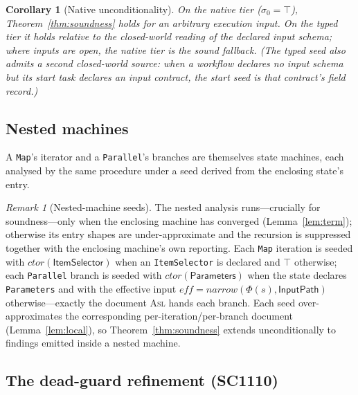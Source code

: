 \documentclass[11pt]{article}
\newcommand{\code}[1]{\textsf{\small #1}}
\newcommand{\asl}{\textsc{Asl}}
\newcommand{\narrow}{\mathit{narrow}}
\newcommand{\eff}{\mathit{eff}}
\theoremstyle{plain}
\newtheorem{corollary}{Corollary}
\theoremstyle{definition}
\theoremstyle{remark}
\newtheorem{remark}{Remark}
\begin{document}
\begin{corollary}[Native unconditionality]
On the native tier ($\sigma_0=\top$), Theorem~\ref{thm:soundness} holds for an arbitrary
execution input. On the typed tier it holds relative to the closed-world reading of the
declared input schema; where inputs are open, the native tier is the sound fallback. (The typed
seed also admits a second closed-world source: when a workflow declares no input schema but its
start task declares an input contract, the start seed is that contract's field record.)
\end{corollary}

\subsection{Nested machines}
\label{sec:tr:nested}

A \texttt{Map}'s iterator and a \texttt{Parallel}'s branches are themselves state machines, each
analysed by the same procedure under a seed derived from the enclosing state's entry.

\begin{remark}[Nested-machine seeds]\label{rmk:nested}
The nested analysis runs---crucially for soundness---only when the enclosing machine has
converged (Lemma~\ref{lem:term}); otherwise its entry shapes are under-approximate and the
recursion is suppressed together with the enclosing machine's own reporting. Each \texttt{Map}
iteration is seeded with $\mathit{ctor}(\textsf{ItemSelector})$ when an \texttt{ItemSelector} is
declared and $\top$ otherwise; each \texttt{Parallel} branch is seeded with
$\mathit{ctor}(\textsf{Parameters})$ when the state declares \texttt{Parameters} and with the
effective input $\eff=\narrow(\Phi(s),\textsf{InputPath})$ otherwise---exactly the document
\asl{} hands each branch. Each seed over-approximates the corresponding per-iteration/per-branch
document (Lemma~\ref{lem:local}), so Theorem~\ref{thm:soundness} extends unconditionally to
findings emitted inside a nested machine.
\end{remark}

\subsection{The dead-guard refinement (\code{SC1110})}
\label{sec:tr:deadguard}
\end{document}
